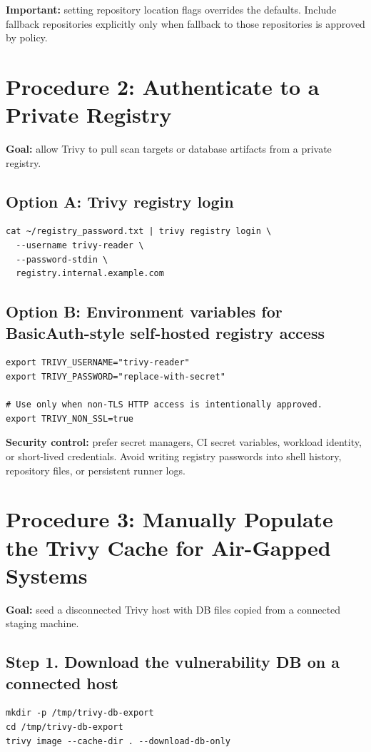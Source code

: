 \documentclass[10pt]{article}
\begin{document}
\textbf{Important:} setting repository location flags overrides the defaults. Include fallback repositories explicitly only when fallback to those repositories is approved by policy.

\section{Procedure 2: Authenticate to a Private Registry}
\textbf{Goal:} allow Trivy to pull scan targets or database artifacts from a private registry.

\subsection{Option A: Trivy registry login}
\begin{verbatim}
cat ~/registry_password.txt | trivy registry login \
  --username trivy-reader \
  --password-stdin \
  registry.internal.example.com
\end{verbatim}

\subsection{Option B: Environment variables for BasicAuth-style self-hosted registry access}
\begin{verbatim}
export TRIVY_USERNAME="trivy-reader"
export TRIVY_PASSWORD="replace-with-secret"

# Use only when non-TLS HTTP access is intentionally approved.
export TRIVY_NON_SSL=true
\end{verbatim}

\textbf{Security control:} prefer secret managers, CI secret variables, workload identity, or short-lived credentials. Avoid writing registry passwords into shell history, repository files, or persistent runner logs.

\section{Procedure 3: Manually Populate the Trivy Cache for Air-Gapped Systems}
\textbf{Goal:} seed a disconnected Trivy host with DB files copied from a connected staging machine.

\subsection{Step 1. Download the vulnerability DB on a connected host}
\begin{verbatim}
mkdir -p /tmp/trivy-db-export
cd /tmp/trivy-db-export
trivy image --cache-dir . --download-db-only
\end{verbatim}
\end{document}
